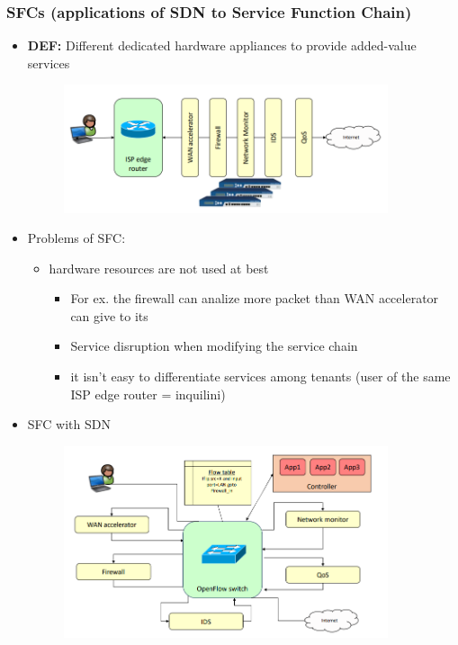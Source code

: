 \documentclass{article}
\begin{document}
\subsubsection{SFCs (applications of SDN to Service Function Chain) }
\begin{itemize}
    \item \textbf{DEF:} Different dedicated hardware appliances to provide added-value services
    \begin{figure}[h]
        \centering
        \includegraphics[width=0.90\textwidth]{figure/service_function_chain.png}
    \end{figure}
    \item Problems of SFC:
    \begin{itemize}
        \item hardware resources are not used at best
        \begin{itemize}
            \item For ex. the firewall can analize more packet than WAN accelerator can give to its
            \item Service disruption when modifying the service chain
            \item it isn’t easy to differentiate services among tenants (user of the same ISP edge router = inquilini)
        \end{itemize}
    \end{itemize}
    \item SFC with SDN
    \begin{figure}[h]
        \centering
        \includegraphics[width=0.90\textwidth]{figure/SFC_with_SDN.png}

\end{figure}
\end{itemize}
\end{document}

